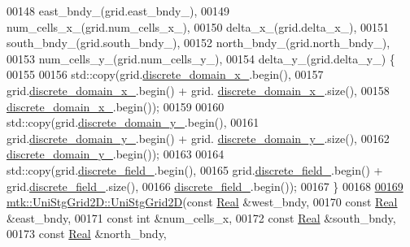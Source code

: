 \begin{DoxyCode}
00148     east\_bndy\_(grid.east\_bndy\_),
00149     num\_cells\_x\_(grid.num\_cells\_x\_),
00150     delta\_x\_(grid.delta\_x\_),
00151     south\_bndy\_(grid.south\_bndy\_),
00152     north\_bndy\_(grid.north\_bndy\_),
00153     num\_cells\_y\_(grid.num\_cells\_y\_),
00154     delta\_y\_(grid.delta\_y\_) \{
00155 
00156     std::copy(grid.\hyperlink{classmtk_1_1UniStgGrid2D_ab15979865852583a46662ea592f27a4f}{discrete\_domain\_x\_}.begin(),
00157               grid.\hyperlink{classmtk_1_1UniStgGrid2D_ab15979865852583a46662ea592f27a4f}{discrete\_domain\_x\_}.begin() + grid.
      \hyperlink{classmtk_1_1UniStgGrid2D_ab15979865852583a46662ea592f27a4f}{discrete\_domain\_x\_}.size(),
00158               \hyperlink{classmtk_1_1UniStgGrid2D_ab15979865852583a46662ea592f27a4f}{discrete\_domain\_x\_}.begin());
00159 
00160     std::copy(grid.\hyperlink{classmtk_1_1UniStgGrid2D_ad69f93d4b27707d97f209b907383a7a2}{discrete\_domain\_y\_}.begin(),
00161               grid.\hyperlink{classmtk_1_1UniStgGrid2D_ad69f93d4b27707d97f209b907383a7a2}{discrete\_domain\_y\_}.begin() + grid.
      \hyperlink{classmtk_1_1UniStgGrid2D_ad69f93d4b27707d97f209b907383a7a2}{discrete\_domain\_y\_}.size(),
00162               \hyperlink{classmtk_1_1UniStgGrid2D_ad69f93d4b27707d97f209b907383a7a2}{discrete\_domain\_y\_}.begin());
00163 
00164     std::copy(grid.\hyperlink{classmtk_1_1UniStgGrid2D_ad7474b2669ee988b84aed20b7f5dc7be}{discrete\_field\_}.begin(),
00165               grid.\hyperlink{classmtk_1_1UniStgGrid2D_ad7474b2669ee988b84aed20b7f5dc7be}{discrete\_field\_}.begin() + grid.\hyperlink{classmtk_1_1UniStgGrid2D_ad7474b2669ee988b84aed20b7f5dc7be}{discrete\_field\_}.size(),
00166               \hyperlink{classmtk_1_1UniStgGrid2D_ad7474b2669ee988b84aed20b7f5dc7be}{discrete\_field\_}.begin());
00167 \}
00168 
\hypertarget{mtk__uni__stg__grid__2d_8cc_source_l00169}{}\hyperlink{classmtk_1_1UniStgGrid2D_ad8813b1ffcf23bb759f59f8524702e80}{00169} \hyperlink{classmtk_1_1UniStgGrid2D_a40db9a6d21e0f4cf70c478fcc3b94531}{mtk::UniStgGrid2D::UniStgGrid2D}(\textcolor{keyword}{const} \hyperlink{group__c01-roots_gac080bbbf5cbb5502c9f00405f894857d}{Real} &west\_bndy,
00170                                 \textcolor{keyword}{const} \hyperlink{group__c01-roots_gac080bbbf5cbb5502c9f00405f894857d}{Real} &east\_bndy,
00171                                 \textcolor{keyword}{const} \textcolor{keywordtype}{int} &num\_cells\_x,
00172                                 \textcolor{keyword}{const} \hyperlink{group__c01-roots_gac080bbbf5cbb5502c9f00405f894857d}{Real} &south\_bndy,
00173                                 \textcolor{keyword}{const} \hyperlink{group__c01-roots_gac080bbbf5cbb5502c9f00405f894857d}{Real} &north\_bndy,

\end{DoxyCode}
